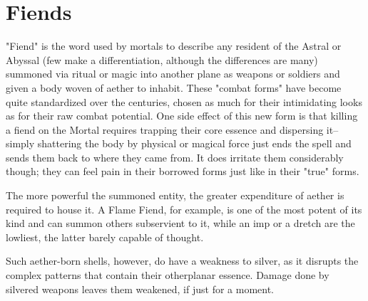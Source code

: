 \section{Fiends}
"Fiend" is the word used by mortals to describe any resident of the Astral or Abyssal (few make a differentiation, although the differences are many) summoned via ritual or magic into another plane as weapons or soldiers and given a body woven of aether to inhabit. These "combat forms" have become quite standardized over the centuries, chosen as much for their intimidating looks as for their raw combat potential. One side effect of this new form is that killing a fiend on the Mortal requires trapping their core essence and dispersing it--simply shattering the body by physical or magical force just ends the spell and sends them back to where they came from. It does irritate them considerably though; they can feel pain in their borrowed forms just like in their "true" forms.

The more powerful the summoned entity, the greater expenditure of aether is required to house it. A Flame Fiend, for example, is one of the most potent of its kind and can summon others subservient to it, while an imp or a dretch are the lowliest, the latter barely capable of thought.

Such aether-born shells, however, do have a weakness to silver, as it disrupts the complex patterns that contain their otherplanar essence. Damage done by silvered weapons leaves them weakened, if just for a moment.

